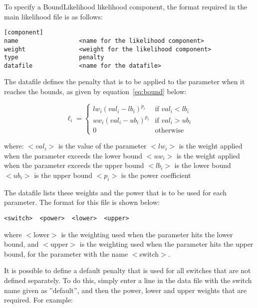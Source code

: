 \documentclass [a4paper, 10pt]{book}
\begin{document}
\bigskip
To specify a BoundLikelihood likelihood component, the format required in the main likelihood file is as follows:

{\small\begin{verbatim}
[component]
name                 <name for the likelihood component>
weight               <weight for the likelihood component>
type                 penalty
datafile             <name for the datafile>
\end{verbatim}}

The datafile defines the penalty that is to be applied to the parameter when it reaches the bounds, as given by equation~\ref{eq:bound} below:

\begin{equation}\label{eq:bound}
\ell_{i} =
\begin{cases}
  lw_{i} (val_{i} - lb_{i})^{p_{i}}
  & \textrm{if $val_{i} < lb_i$}\\
  uw_{i} (val_{i} - ub_{i})^{p_{i}}
  & \textrm{if $val_{i} > ub_i$}\\
  0
  & \textrm{otherwise}
\end{cases}
\end{equation}

where:\newline
$<val_i>$ is the value of the parameter\newline
$<lw_i>$ is the weight applied when the parameter exceeds the lower bound\newline
$<uw_i>$ is the weight applied when the parameter exceeds the upper bound\newline
$<lb_i>$ is the lower bound\newline
$<ub_i>$ is the upper bound\newline
$<p_i>$ is the power coefficient

\bigskip
The datafile lists these weights and the power that is to be used for each parameter.  The format for this file is shown below:

{\small\begin{verbatim}
<switch>  <power>  <lower>  <upper>
\end{verbatim}}

where $<$lower$>$ is the weighting used when the parameter hits the lower bound, and $<$upper$>$ is the weighting used when the parameter hits the upper bound, for the parameter with the name $<$switch$>$.

\bigskip
It is possible to define a default penalty that is used for all switches that are not defined separately.  To do this, simply enter a line in the data file with the switch name given as ''default'', and then the power, lower and upper weights that are required.  For example:
\end{document}
